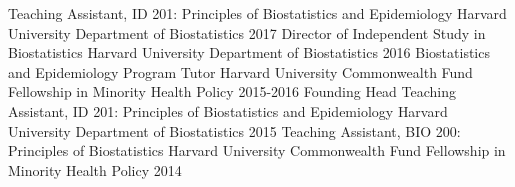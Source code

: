 

\begin{cvinvolves}
	\cvinvolve
	{Teaching Assistant, ID 201: Principles of Biostatistics and Epidemiology} %
	{Harvard University Department of Biostatistics} %
	{} %
	{2017} %
\cvinvolve
{Director of Independent Study in Biostatistics} %
{Harvard University Department of Biostatistics} %
{} %
{2016} %
\cvinvolve
{Biostatistics and Epidemiology Program Tutor} %
{Harvard University Commonwealth Fund Fellowship in Minority Health Policy} %
{} %
{2015-2016} %
\cvinvolve
{Founding Head Teaching Assistant, ID 201: Principles of Biostatistics and Epidemiology} %
{Harvard University Department of Biostatistics} %
{} %
{2015} %
\cvinvolve
{Teaching Assistant, BIO 200: Principles of Biostatistics} %
{Harvard University Commonwealth Fund Fellowship in Minority Health Policy} %
{} %
{2014} %
	
\end{cvinvolves}

